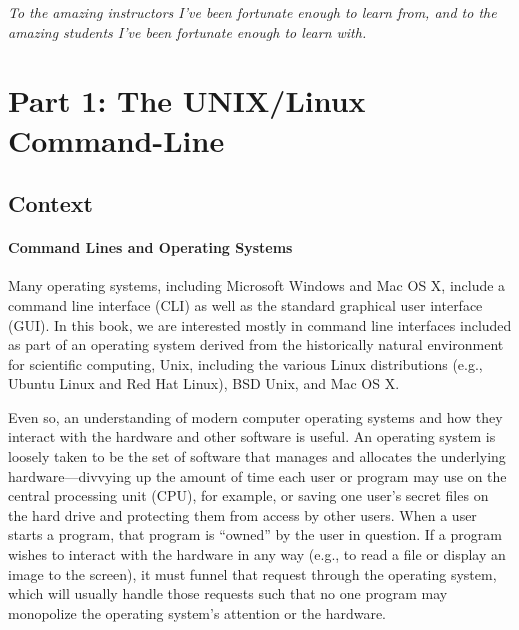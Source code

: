 \documentclass[
]{memoir}
\begin{document}
\emph{To the amazing instructors I've been fortunate enough to learn from, and to the amazing students I've been fortunate enough to learn with.}

\hypertarget{part-part-1-the-unixlinux-command-line}{%
\part*{Part 1: The UNIX/Linux Command-Line}\label{part-part-1-the-unixlinux-command-line}}

\hypertarget{context}{%
\chapter{Context}\label{context}}

\hypertarget{command-lines-and-operating-systems}{%
\subsection*{Command Lines and Operating Systems}\label{command-lines-and-operating-systems}}

Many operating systems, including Microsoft Windows and Mac OS X, include a command line interface (CLI) as well as the standard graphical user interface (GUI). In this book, we are interested mostly in command line interfaces included as part of an operating system derived from the historically natural environment for scientific computing, Unix, including the various Linux distributions (e.g., Ubuntu Linux and Red Hat Linux), BSD Unix, and Mac OS X.

Even so, an understanding of modern computer operating systems and how they interact with the hardware and other software is useful. An operating system is loosely taken to be the set of software that manages and allocates the underlying hardware---divvying up the amount of time each user or program may use on the central processing unit (CPU), for example, or saving one user's secret files on the hard drive and protecting them from access by other users. When a user starts a program, that program is \enquote{owned} by the user in question. If a program wishes to interact with the hardware in any way (e.g., to read a file or display an image to the screen), it must funnel that request through the operating system, which will usually handle those requests such that no one program may monopolize the operating system's attention or the hardware.
\end{document}
